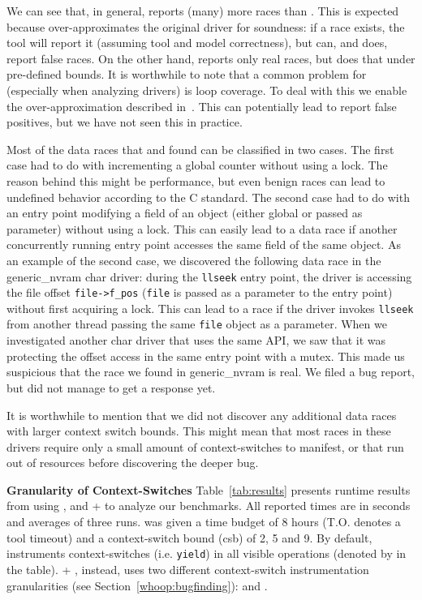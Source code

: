 We can see that, in general, \whoop reports (many) more races than \corral. This is expected because \whoop over-approximates the original driver for soundness: if a race exists, the tool will report it (assuming tool and model correctness), but \whoop can, and does, report false races. On the other hand, \corral reports only real races, but does that under pre-defined bounds. It is worthwhile to note that a common problem for \corral (especially when analyzing drivers) is loop coverage. To deal with this we enable the over-approximation described in~\cite{lal2014powering}. This can potentially lead \corral to report false positives, but we have not seen this in practice.

Most of the data races that \whoop and \corral found can be classified in two cases. The first case had to do with incrementing a global counter without using a lock. The reason behind this might be performance, but even benign races can lead to undefined behavior according to the C standard. The second case had to do with an entry point modifying a field of an object (either global or passed as parameter) without using a lock. This can easily lead to a data race if another concurrently running entry point accesses the same field of the same object. As an example of the second case, we discovered the following data race in the generic\_nvram char driver: during the \texttt{llseek} entry point, the driver is accessing the file offset \texttt{file->f\_pos} (\texttt{file} is passed as a parameter to the entry point) without first acquiring a lock. This can lead to a race if the driver invokes \texttt{llseek} from another thread passing the same \texttt{file} object as a parameter. When we investigated another char driver that uses the same API, we saw that it was protecting the offset access in the same entry point with a mutex. This made us suspicious that the race we found in generic\_nvram is real. We filed a bug report, but did not manage to get a response yet.

It is worthwhile to mention that we did not discover any additional data races with larger context switch bounds. This might mean that most races in these drivers require only a small amount of context-switches to manifest, or that \corral run out of resources before discovering the deeper bug.

\noindent
\textbf{Granularity of Context-Switches}\xspace\xspace Table~\ref{tab:results} presents runtime results from using \whoop, \corral and \whoop + \corral to analyze our benchmarks. All reported times are in seconds and averages of three runs. \corral was given a time budget of 8 hours (T.O. denotes a tool timeout) and a context-switch bound (csb) of 2, 5 and 9. By default, \corral instruments context-switches (i.e. \texttt{yield}) in all visible operations (denoted by \yieldall in the table). \whoop + \corral, instead, uses two different context-switch instrumentation granularities (see Section~\ref{whoop:bugfinding}): \yieldcoarse and \yieldmr.

